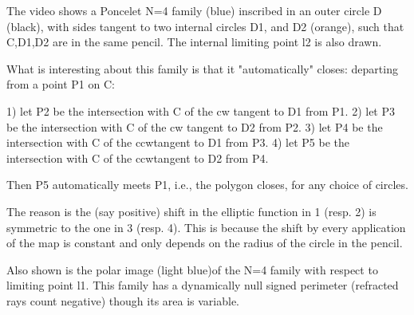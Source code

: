 The video shows a Poncelet N=4 family (blue) inscribed in an outer circle D  (black), with sides tangent to two internal circles D1, and D2 (orange), such that C,D1,D2 are in the same pencil. The internal limiting point l2 is also drawn.  

What is interesting about this family is that it "automatically" closes: departing from a point P1 on C:

1) let P2 be the intersection with C of the cw tangent to D1 from P1. 
2) let P3 be the intersection with C of the cw tangent to D2 from P2.
3) let P4 be the intersection with C of the ccwtangent to D1 from P3.
4) let P5 be the intersection with C of the ccwtangent to D2 from P4.

Then P5 automatically meets P1, i.e., the polygon closes, for any choice of circles.

The reason is the (say positive) shift in the elliptic function in 1 (resp. 2) is symmetric to the one in 3 (resp. 4). This is because the shift by every application of the map is constant and only depends on the radius of the circle in the pencil.

Also shown is the polar image (light blue)of the N=4 family with respect to limiting point l1. This family has a dynamically null signed perimeter (refracted rays count negative) though its area is variable.